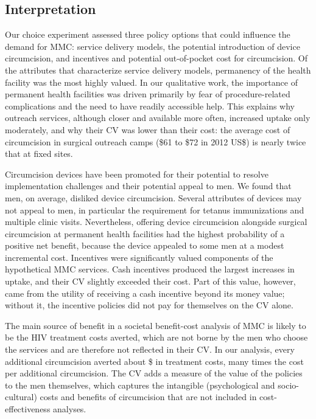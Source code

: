\documentclass[11pt]{article}
\numberwithin{equation}{section}\numberwithin{figure}{section}\numberwithin{table}{section}
\begin{document}
\subsection{Interpretation}
Our choice experiment assessed three policy options that could influence the demand for MMC: service delivery models, the potential introduction of device circumcision, and incentives and potential out-of-pocket cost for circumcision. Of the attributes that characterize service delivery models, permanency of the health facility was the most highly valued. In our qualitative work, the importance of permanent health facilities was driven primarily by fear of procedure-related complications and the need to have readily accessible help. This explains why outreach services, although closer and available more often, increased uptake only moderately, and why their CV was lower than their cost: the average cost of circumcision in surgical outreach camps (\$61 to \$72 in 2012 US\$\cite{RN296}) is nearly twice that at fixed sites.

Circumcision devices have been promoted for their potential to resolve implementation challenges and their potential appeal to men.\cite{RN167} We found that men, on average, disliked device circumcision. Several attributes of devices may not appeal to men, in particular the requirement for tetanus immunizations and multiple clinic visits.\cite{RN285} Nevertheless, offering device circumcision alongside surgical circumcision at permanent health facilities had the highest probability of a positive net benefit, because the device appealed to some men at a modest incremental cost. Incentives were significantly valued components of the hypothetical MMC services. Cash incentives produced the largest increases in uptake, and their CV slightly exceeded their cost. Part of this value, however, came from the utility of receiving a cash incentive beyond its money value; without it, the incentive policies did not pay for themselves on the CV alone.

The main source of benefit in a societal benefit-cost analysis of MMC is likely to be the HIV treatment costs averted, which are not borne by the men who choose the services and are therefore not reflected in their CV. In our analysis, every additional circumcision averted about \$\mmctxPerMMC{} in treatment costs, many times the cost per additional circumcision. The CV adds a measure of the value of the policies to the men themselves, which captures the intangible (psychological and socio-cultural) costs and benefits of circumcision that are not included in cost-effectiveness analyses.
\end{document}
